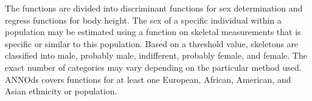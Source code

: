\documentclass[sw]{iosart2x}
\begin{document}
The functions are divided into discriminant functions for sex determination and regress functions for body height.
The sex of a specific individual within a population may be estimated using a function on skeletal measurements that is specific or similar to this population.
Based on a threshold value, skeletons are classified into male, probably male, indifferent, probably female, and female.
The exact number of categories may vary depending on the particular method used.
ANNOds covers functions for at least one European, African, American, and Asian ethnicity or population.
%
%
%
%
\end{document}
